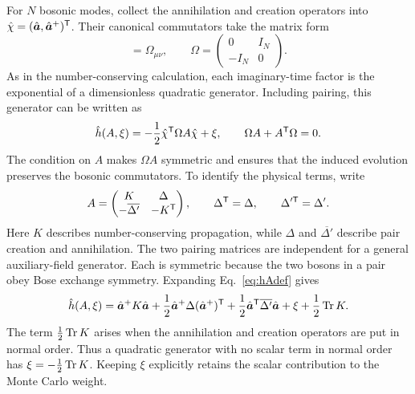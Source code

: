 For $N$ bosonic modes, collect the annihilation and creation operators into $\hat\chi=(\hat{\bm{a}},\hat{\bm{a}}^+)^{\mathsf{T}}$. Their canonical commutators take the matrix form
\begin{equation}
    [\hat\chi_\mu,\hat\chi_\nu]=\Omega_{\mu\nu},
    \qquad
    \Omega=
    \begin{pmatrix}
        0&I_N\\
        -I_N&0
    \end{pmatrix}.
\end{equation}
As in the number-conserving calculation, each imaginary-time factor is the exponential of a dimensionless quadratic generator. Including pairing, this generator can be written as
\begin{equation}
    \hat h(A,\xi)=-\frac12\hat\chi^{\mathsf{T}}\Omega A\hat\chi+\xi,
    \qquad
    \Omega A+A^{\mathsf{T}}\Omega=0.
    \label{eq:hAdef}
\end{equation}
The condition on $A$ makes $\Omega A$ symmetric and ensures that the induced evolution preserves the bosonic commutators. To identify the physical terms, write
\begin{equation}
    A=
    \begin{pmatrix}
        K&\Delta\\
        -\overline{\Delta'}&-K^{\mathsf{T}}
    \end{pmatrix},
    \qquad
    \Delta^{\mathsf{T}}=\Delta,
    \qquad
    \Delta'^{\mathsf{T}}=\Delta'.
\end{equation}
Here $K$ describes number-conserving propagation, while $\Delta$ and $\overline{\Delta'}$ describe pair creation and annihilation. The two pairing matrices are independent for a general auxiliary-field generator. Each is symmetric because the two bosons in a pair obey Bose exchange symmetry. Expanding Eq.~\eqref{eq:hAdef} gives
\begin{equation}
    \hat h(A,\xi)=\hat{\bm{a}}^+K\hat{\bm{a}}
    +\frac12\hat{\bm{a}}^+\Delta(\hat{\bm{a}}^+)^{\mathsf{T}}
    +\frac12\hat{\bm{a}}^{\mathsf{T}}\overline{\Delta'}\hat{\bm{a}}
    +\xi+\frac12\operatorname{Tr} K.
\label{eq:block_form_h}
\end{equation}
The term $\frac12\operatorname{Tr} K$ arises when the annihilation and creation operators are put in normal order. Thus a quadratic generator with no scalar term in normal order has $\xi=-\frac12\operatorname{Tr} K$. Keeping $\xi$ explicitly retains the scalar contribution to the Monte Carlo weight.

